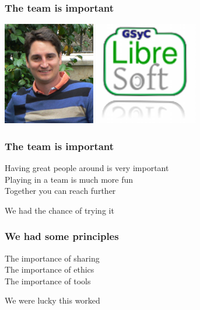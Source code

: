 \documentclass[17pt,aspectratio=169,hyperref=pdfusetitle]{beamer}
\begin{document}
\begin{frame}[fragile]
  \frametitle{The team is important}

  \begin{center}
  \includegraphics[height=4.5cm]{figs/gregorio-robles}
  \includegraphics[height=4.5cm]{figs/libresoft}
  \end{center}  
  
\end{frame}

\begin{frame}[fragile]
  \frametitle{The team is important}

  Having great people around is very important \\
  Playing in a team is much more fun \\
  Together you can reach further \\
  
  \begin{center}
    We had the chance of trying it
  \end{center}  
  
\end{frame}


\begin{frame}[fragile]
  \frametitle{We had some principles}

  The importance of sharing \\
  The importance of ethics \\
  The importance of tools \\

  \begin{center}
    We were lucky this worked
  \end{center}
\end{frame}
\end{document}
